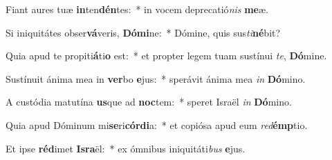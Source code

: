 \item Fiant aures tuæ \textbf{in}ten\textbf{dén}tes:~* in vocem deprecatió\textit{nis} \textbf{me}æ.
\item Si iniquitátes obser\textbf{vá}veris, \textbf{Dó}\textbf{mi}ne:~* Dómine, quis sus\textit{ti}\textbf{né}bit?
\item Quia apud te propiti\textbf{á}ti\textbf{o} est:~* et propter legem tuam sustínui \textit{te}, \textbf{Dó}mine.
\item Sustínuit ánima mea in \textbf{ver}bo \textbf{e}jus:~* sperávit ánima mea \textit{in} \textbf{Dó}mino.
\item A custódia matutína \textbf{us}que ad \textbf{noc}tem:~* speret Israël \textit{in} \textbf{Dó}mino.
\item Quia apud Dóminum mi\textbf{se}ri\textbf{cór}\textbf{di}a:~* et copiósa apud eum \textit{red}\textbf{émp}tio.
\item Et ipse \textbf{réd}imet \textbf{Is}\textbf{ra}ël:~* ex ómnibus iniquitáti\textit{bus} \textbf{e}jus.

